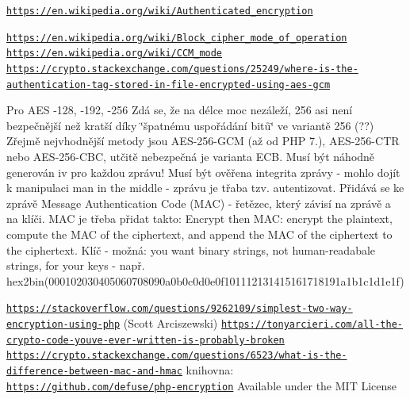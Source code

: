 \href{https://en.wikipedia.org/wiki/Authenticated_encryption}{\tt https\+://en.\+wikipedia.\+org/wiki/\+Authenticated\+\_\+encryption}

\href{https://en.wikipedia.org/wiki/Block_cipher_mode_of_operation}{\tt https\+://en.\+wikipedia.\+org/wiki/\+Block\+\_\+cipher\+\_\+mode\+\_\+of\+\_\+operation} \href{https://en.wikipedia.org/wiki/CCM_mode}{\tt https\+://en.\+wikipedia.\+org/wiki/\+C\+C\+M\+\_\+mode} \href{https://crypto.stackexchange.com/questions/25249/where-is-the-authentication-tag-stored-in-file-encrypted-using-aes-gcm}{\tt https\+://crypto.\+stackexchange.\+com/questions/25249/where-\/is-\/the-\/authentication-\/tag-\/stored-\/in-\/file-\/encrypted-\/using-\/aes-\/gcm}

Pro A\+ES -\/128, -\/192, -\/256 Zdá se, že na délce moc nezáleží, 256 asi není bezpečnější než kratší díky \char`\"{}špatnému uspořádání bitů\char`\"{} ve variantě 256 (??) Zřejmě nejvhodnější metody jsou A\+E\+S-\/256-\/\+G\+CM (až od P\+HP 7.), A\+E\+S-\/256-\/\+C\+TR nebo A\+E\+S-\/256-\/\+C\+BC, utčitě nebezpečná je varianta E\+CB. Musí být náhodně generován iv pro každou zprávu! Musí být ověřena integrita zprávy -\/ mohlo dojít k manipulaci man in the middle -\/ zprávu je třaba tzv. autentizovat. Přidává se ke zprávě Message Authentication Code (M\+AC) -\/ řetězec, který závisí na zprávě a na klíči. M\+AC je třeba přidat takto\+: Encrypt then M\+AC\+: encrypt the plaintext, compute the M\+AC of the ciphertext, and append the M\+AC of the ciphertext to the ciphertext. Klíč -\/ možná\+: you want binary strings, not human-\/readabale strings, for your keys -\/ např. hex2bin(\textquotesingle{}000102030405060708090a0b0c0d0e0f1011121314151617181‌​91a1b1c1d1e1f\textquotesingle{})

\href{https://stackoverflow.com/questions/9262109/simplest-two-way-encryption-using-php}{\tt https\+://stackoverflow.\+com/questions/9262109/simplest-\/two-\/way-\/encryption-\/using-\/php} (Scott Arciszewski) \href{https://tonyarcieri.com/all-the-crypto-code-youve-ever-written-is-probably-broken}{\tt https\+://tonyarcieri.\+com/all-\/the-\/crypto-\/code-\/youve-\/ever-\/written-\/is-\/probably-\/broken} \href{https://crypto.stackexchange.com/questions/6523/what-is-the-difference-between-mac-and-hmac}{\tt https\+://crypto.\+stackexchange.\+com/questions/6523/what-\/is-\/the-\/difference-\/between-\/mac-\/and-\/hmac} knihovna\+: \href{https://github.com/defuse/php-encryption}{\tt https\+://github.\+com/defuse/php-\/encryption} Available under the M\+IT License

